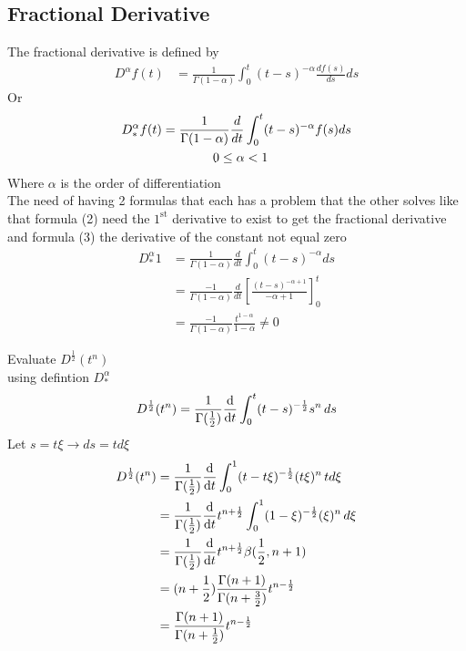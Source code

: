 \documentclass[]{article}
\begin{document}
\subsection{Fractional Derivative}
The fractional derivative is defined by
\begin{align}
    D^{\alpha}f(t) & = \frac{1}{\Gamma(1-\alpha)}\int_{0}^{t}(t-s)^{-\alpha}\frac{d f(s)}{ds}ds
\end{align}
Or
\begin{align}
    D_*^{\alpha}f(t) & = \frac{1}{\Gamma(1-\alpha)}\frac{d}{dt}\int_{0}^{t}(t-s)^{-\alpha}f(s)ds
    \\\notag
                     & \quad\quad\quad\quad0\leq \alpha < 1
\end{align}
Where $\alpha$ is the order of differentiation
\\
The need of having 2 formulas that each has a problem that the other solves
like that formula (2) need the $1^{\text{st}}$ derivative to exist to get the fractional derivative
and formula (3) the derivative of the constant not equal zero
\begin{align*}
    D_*^{\alpha} 1 & = \frac{1}{\Gamma(1-\alpha)}\frac{d}{dt}\int_{0}^{t}(t-s)^{-\alpha}ds
    \\
                   & = \frac{-1}{\Gamma(1-\alpha)}\frac{d}{dt} \left[\frac{(t-s)^{-\alpha+1}}{-\alpha+1}\right]_{0}^{t}
    \\
                   & = \frac{-1}{\Gamma(1-\alpha)} \frac{t^{1-\alpha}}{1-\alpha} \neq 0
\end{align*}

\begin{example}
    Evaluate $D^{\frac{1}{2}}(t^n)$\\
    using defintion  $D_*^\alpha$\\
    $$D^{\frac{1}{2}}(t^n) = \frac{1}{\Gamma{(\frac{1}{2})}} \dv{}{t} \int_0^t (t-s)^{-\frac{1}{2}} s^n \, ds$$
    Let $s = t\xi \rightarrow ds=td\xi$\\
    \begin{align*}
        D^{\frac{1}{2}}(t^n) & = \frac{1}{\Gamma{(\frac{1}{2})}} \dv{}{t} \int_0^1 (t-t\xi)^{-\frac{1}{2}} (t\xi)^n \, td\xi                 \\
                             & = \frac{1}{\Gamma{(\frac{1}{2})}}  \dv{}{t} t^{n+\frac{1}{2}} \int_0^1 (1-\xi)^{-\frac{1}{2}} (\xi)^n \, d\xi \\
                             & = \frac{1}{\Gamma{(\frac{1}{2})}}  \dv{}{t} t^{n+\frac{1}{2}} \beta{(\frac{1}{2}, n+1)}                       \\
                             & = (n+\frac{1}{2}) \frac{\Gamma{(n+1)}}{\Gamma{(n+\frac{3}{2})}}      t^{n-\frac{1}{2}}                        \\
                             & = \frac{\Gamma{(n+1)}}{\Gamma{(n+\frac{1}{2})}}  t^{n-\frac{1}{2}}                                            \\
    \end{align*}
\end{example}
\end{document}
